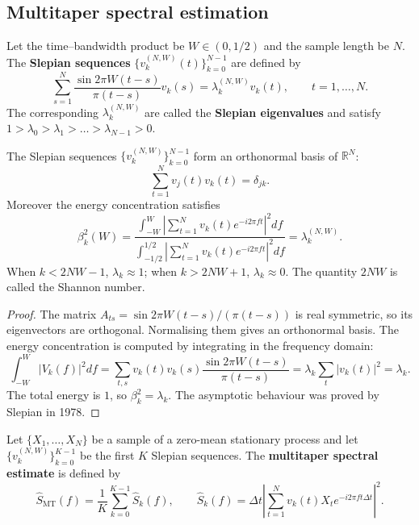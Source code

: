 \subsection{Multitaper spectral estimation}

\begin{definition}\label{def:slepian}
Let the time--bandwidth product be $W\in(0,1/2)$ and the sample length be $N$. The \textbf{Slepian sequences} $\{v_k^{(N,W)}(t)\}_{k=0}^{N-1}$ are defined by
\[
\sum_{s=1}^{N}\frac{\sin2\pi W(t-s)}{\pi(t-s)}v_k(s)=\lambda_k^{(N,W)}v_k(t),\qquad t=1,\dots,N.
\]
The corresponding $\lambda_k^{(N,W)}$ are called the \textbf{Slepian eigenvalues} and satisfy $1>\lambda_0>\lambda_1>\dots>\lambda_{N-1}>0$.
\end{definition}

\begin{theorem}\label{thm:slepian}
The Slepian sequences $\{v_k^{(N,W)}\}_{k=0}^{N-1}$ form an orthonormal basis of $\mathbb R^N$:
\[
\sum_{t=1}^{N}v_j(t)v_k(t)=\delta_{jk}.
\]
Moreover the energy concentration satisfies
\[
\beta_k^2(W)=\frac{\int_{-W}^{W}|\sum_{t=1}^{N}v_k(t)e^{-i2\pi ft}|^2df}{\int_{-1/2}^{1/2}|\sum_{t=1}^{N}v_k(t)e^{-i2\pi ft}|^2df}=\lambda_k^{(N,W)}.
\]
When $k<2NW-1$, $\lambda_k\approx1$; when $k>2NW+1$, $\lambda_k\approx0$. The quantity $2NW$ is called the Shannon number.
\end{theorem}

\begin{proof}
The matrix $A_{ts}=\sin2\pi W(t-s)/(\pi(t-s))$ is real symmetric, so its eigenvectors are orthogonal. Normalising them gives an orthonormal basis. The energy concentration is computed by integrating in the frequency domain:
\[
\int_{-W}^{W}|V_k(f)|^2df
=\sum_{t,s}v_k(t)v_k(s)\frac{\sin2\pi W(t-s)}{\pi(t-s)}
=\lambda_k\sum_t|v_k(t)|^2=\lambda_k.
\]
The total energy is $1$, so $\beta_k^2=\lambda_k$. The asymptotic behaviour was proved by Slepian in 1978.
\end{proof}

\begin{definition}\label{def:multitaper}
Let $\{X_1,\dots,X_N\}$ be a sample of a zero-mean stationary process and let $\{v_k^{(N,W)}\}_{k=0}^{K-1}$ be the first $K$ Slepian sequences. The \textbf{multitaper spectral estimate} is defined by
\[
\hat S_{\mathrm{MT}}(f)=\frac1K\sum_{k=0}^{K-1}\hat S_k(f),\qquad
\hat S_k(f)=\Delta t\left|\sum_{t=1}^{N}v_k(t)X_te^{-i2\pi ft\Delta t}\right|^2.
\]
\end{definition}

